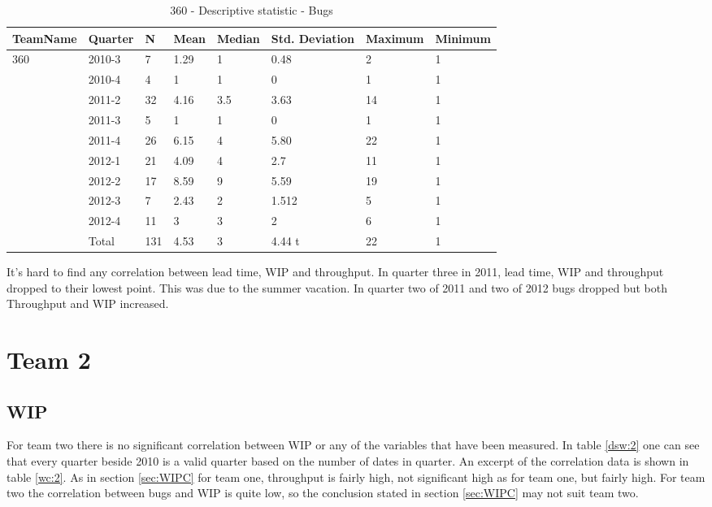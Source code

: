 \documentclass[UKenglish]{ifimaster}  %
\begin{document}
 \begin{table}[!htbp]
\begin{tabular}{ | l | l | l | l | l | l | l | l | }
\hline
	TeamName & Quarter & N & Mean & Median & Std. Deviation & Maximum & Minimum \\ \hline
	360 & 2010-3 & 7 & 1.29 & 1 & 0.48 & 2 & 1 \\ \hline
	 & 2010-4 & 4 & 1 & 1 & 0 & 1 & 1 \\ \hline
	 & 2011-2 & 32 & 4.16 & 3.5 & 3.63 & 14 & 1 \\ \hline
	 & 2011-3 & 5 & 1 & 1 & 0 & 1 & 1 \\ \hline
	 & 2011-4 & 26 & 6.15 & 4 & 5.80 & 22 & 1 \\ \hline
	 & 2012-1 & 21 & 4.09 & 4 & 2.7 & 11 & 1 \\ \hline
	 & 2012-2 & 17 & 8.59 & 9 & 5.59& 19 & 1 \\ \hline
	 & 2012-3 & 7 & 2.43 & 2 & 1.512 & 5 & 1 \\ \hline
	 & 2012-4 & 11 & 3 & 3 & 2 & 6 & 1 \\ \hline
	 & Total & 131 & 4.53 & 3 & 4.44 t & 22 & 1 \\ \hline
	 \end{tabular}
\caption{360 - Descriptive statistic - Bugs }%

\end{table}

It's hard to find any correlation between lead time, WIP and throughput. In quarter three in 2011, lead time, WIP and throughput dropped to their lowest point. This was due to the summer vacation. In quarter two of 2011 and two of 2012 bugs dropped but both Throughput and WIP increased.  
\newpage


\section{Team 2}
\subsection{WIP}
For team two there is no significant correlation between WIP or any of the variables that have been measured. In table \ref{dsw:2} one can see that every quarter beside 2010 is a valid quarter based on the number of dates in quarter. An excerpt of the correlation data is shown in table \ref{wc:2}.  As in section \ref{sec:WIPC} for team one, throughput is fairly high, not significant high as for team one, but fairly high. For team two the correlation between bugs and WIP is quite low, so the conclusion stated in section \ref{sec:WIPC}  may not suit team two. 
\end{document}

